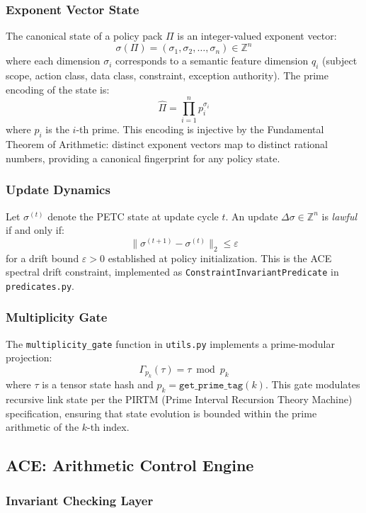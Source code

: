 \documentclass[12pt,letterpaper]{article}
\theoremstyle{definition}
\theoremstyle{remark}
\begin{document}
\subsubsection{Exponent Vector State}

The canonical state of a policy pack \(\Pi\) is an integer-valued exponent vector:
\[
  \sigma(\Pi) = (\sigma_1, \sigma_2, \ldots, \sigma_n) \in \mathbb{Z}^n \tag{2}
\]
where each dimension \(\sigma_i\) corresponds to a semantic feature dimension \(q_i\)
(subject scope, action class, data class, constraint, exception authority). The prime
encoding of the state is:
\[
  \hat{\Pi} = \prod_{i=1}^{n} p_i^{\sigma_i} \tag{3}
\]
where \(p_i\) is the \(i\)-th prime. This encoding is injective by the Fundamental
Theorem of Arithmetic: distinct exponent vectors map to distinct rational numbers,
providing a canonical fingerprint for any policy state.

\subsubsection{Update Dynamics}

Let \(\sigma^{(t)}\) denote the PETC state at update cycle \(t\). An update
\(\Delta\sigma \in \mathbb{Z}^n\) is \emph{lawful} if and only if:
\[
  \|\sigma^{(t+1)} - \sigma^{(t)}\|_2 \leq \varepsilon \tag{4}
\]
for a drift bound \(\varepsilon > 0\) established at policy initialization. This is the
ACE spectral drift constraint, implemented as \texttt{ConstraintInvariantPredicate} in
\texttt{predicates.py}.

\subsubsection{Multiplicity Gate}

The \texttt{multiplicity\_gate} function in \texttt{utils.py} implements a prime-modular
projection:
\[
  \Gamma_{p_k}(\tau) = \tau \bmod p_k \tag{5}
\]
where \(\tau\) is a tensor state hash and \(p_k = \texttt{get\_prime\_tag}(k)\). This
gate modulates recursive link state per the PIRTM (Prime Interval Recursion Theory
Machine) specification, ensuring that state evolution is bounded within the prime
arithmetic of the \(k\)-th index.

\subsection{ACE: Arithmetic Control Engine}

\subsubsection{Invariant Checking Layer}
\end{document}

